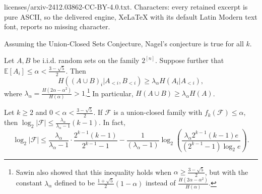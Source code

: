 \documentclass[10pt,a4paper]{amsart}
\newcommand{\E}{\mathbb{E}}
\newcommand{\F}{\mathcal{F}}
\begin{document}
licenses/arxiv-2412.03862-CC-BY-4.0.txt. Characters: every retained excerpt is pure ASCII, so the delivered engine, XeLaTeX with its default Latin Modern text font, reports no missing character.
\begin{observation} \label{obs:equivalence}
    Assuming the Union-Closed Sets Conjecture, Nagel's conjecture is true for all $k$.
\end{observation}

    \begin{lemma}\label{lemma:afterk}
        Let $A,B$ be i.i.d. random sets on the family $2^{[n]}$. Suppose further that $\E[A_i]\leq \alpha< \frac{3-\sqrt{5}}{2}$. Then 
        \[H((A\cup B)_i|A_{< i},B_{<i}) \geq \lambda_\alpha H(A_i |A_{< i}),\]
        where $\lambda_\alpha =\frac{H(2\alpha-\alpha^2)}{H(\alpha)}>1$.\footnote{Sawin also showed that this inequality holds when $\alpha \ge \frac{3 - \sqrt{5}}{2}$, but with the constant $\lambda_{\alpha}$ defined to be $\frac{1+\sqrt{5}}{2} (1 - \alpha)$ instead of $\frac{H(2\alpha - \alpha^2)}{H(\alpha)}$.} In particular, $H(A\cup B)\geq \lambda_\alpha H(A)$.
    \end{lemma}

    \begin{theorem}\label{thm:largeNew}
        Let $k\geq 2$ and $0 < \alpha<\frac{3-\sqrt{5}}{2}$. If $\F$ is a union-closed family with $f_k(\F)\leq \alpha$, then $\log_2|\F|\leq \frac{\lambda_\alpha}{\lambda_\alpha-1}(k-1)$. In fact,
        \[\log_2|\F| \leq \frac{\lambda_\alpha}{\lambda_\alpha-1}\cdot \frac{2^{k-1}(k-1)}{2^{k-1}-1} -\frac{1}{(\lambda_\alpha-1)}\log_2\left(\frac{\lambda_\alpha2^{k-1}(k-1)e}{(2^{k-1}-1)\log_2 e }\right).\]
    \end{theorem}
\end{document}
